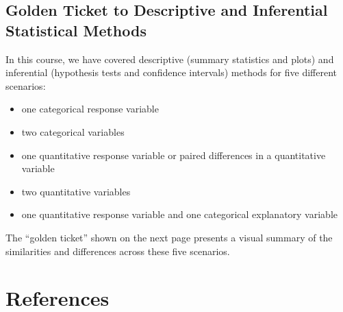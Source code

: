 \documentclass[
]{report}
\providecommand{\tightlist}{%
  \setlength{\itemsep}{0pt}\setlength{\parskip}{0pt}}
\begin{document}
\newpage

\hypertarget{golden-ticket-to-descriptive-and-inferential-statistical-methods}{%
\section{Golden Ticket to Descriptive and Inferential Statistical Methods}\label{golden-ticket-to-descriptive-and-inferential-statistical-methods}}

In this course, we have covered descriptive (summary statistics and plots) and inferential (hypothesis tests and confidence intervals) methods for five different scenarios:

\begin{itemize}
\tightlist
\item
  one categorical response variable
\item
  two categorical variables
\item
  one quantitative response variable or paired differences in a quantitative variable
\item
  two quantitative variables
\item
  one quantitative response variable and one categorical explanatory variable
\end{itemize}

The ``golden ticket'' shown on the next page presents a visual summary of the similarities and differences across these five scenarios.



\hypertarget{references}{%
\chapter*{References}\label{references}}
\end{document}
